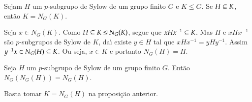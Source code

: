 \begin{proposicao}
	Sejam $H$ um $p$-subgrupo de Sylow de um grupo finito $G$ e $K \le G$. Se $H \subseteq K$, ent\~ao $K = N_G(K)$.
\end{proposicao}
\begin{prova}
	Seja $x \in N_G(K)$. Como $H \subseteq K \unlhd N_G(K)$, segue que $xHx^{-1} \subseteq K$. Mas $H$ e $xHx^{-1}$ s\~ao $p$-subgrupos de Sylow de $K$, da{\'\i} existe $y \in H$ tal que $xHx^{-1} = yHy^{-1}$. Assim $y^{-1}x \in N_G(H) \subseteq K$. Ou seja, $x \in K$ e portanto $N_G(H) = H$.
\end{prova}

\begin{corolario}
	Seja $H$ um $p$-subgrupo de Sylow de um grupo finito $G$. Ent\~ao $N_G(N_G(H)) = N_G(H)$.
\end{corolario}
\begin{prova}
	Basta tomar $K = N_G(H)$ na proposi\c{c}\~ao anterior.
\end{prova}




